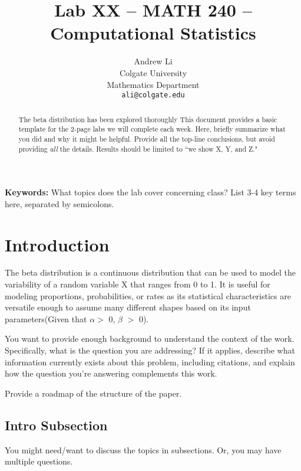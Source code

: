\documentclass{article}\usepackage[]{graphicx}\usepackage[]{xcolor}
\begin{document}
\vspace{-1in}
\title{Lab XX -- MATH 240 -- Computational Statistics}

\author{
  Andrew Li \\
  Colgate University  \\
  Mathematics Department  \\
  {\tt ali@colgate.edu}
}

\date{}

\maketitle

\begin{multicols}{2}
\begin{abstract}
The beta distribution has been explored thoroughly  
This document provides a basic template for the 2-page labs we will complete each week. Here, briefly summarize what you did and why it might be helpful. Provide all the top-line conclusions, but avoid providing \emph{all} the details. Results should be limited to ``we show X, Y, and Z."
\end{abstract}

\noindent \textbf{Keywords:} What topics does the lab cover concerning class? List 3-4 key terms here, separated by semicolons.

\section{Introduction}
The beta distribution is a continuous distribution that can be used to model the variability of a random variable X that ranges from 0 to 1. It is useful for modeling proportions, probabilities, or rates as its statistical characteristics are versatile enough to assume many different shapes based on its input parameters(Given that $\alpha >$ 0, $\beta$ $>$ 0). 


You want to provide enough background to understand the context of the work. Specifically, what is the question you are addressing? If it applies, describe what information currently exists about this problem, including citations, and explain how the question you're answering complements this work.

Provide a roadmap of the structure of the paper. 

\subsection{Intro Subsection}
You might need/want to discuss the topics in subsections. Or, you may have multiple questions.


\end{multicols}
\end{document}
